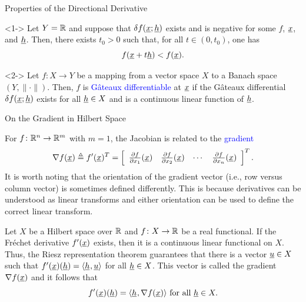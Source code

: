 \documentclass[10pt,english,aspectratio=169]{beamer}
\begin{document}
\begin{frame}{Properties of the Directional Derivative}

\begin{lemma}<1->
Let $Y=\mathbb{R}$ and suppose that $\delta f (\underline{x};\underline{h})$ exists and is negative for some $f$, $\underline{x}$, and $\underline{h}$.  Then, there exists $t_0 > 0$ such that, for all $t\in(0,t_0)$, one has \vspace{-2mm}
\[ f(\underline{x}+t \underline{h}) < f (\underline{x}). \]
\end{lemma}


\vspace{5mm}

\begin{definition}<2->
Let $f \colon X \rightarrow Y$ be a mapping from a vector space $X$ to a Banach space $(Y,\|\cdot\|)$.
Then, $f$ is \textcolor{blue}{G\^{a}teaux differentiable} at $\underline{x}$ if the G\^{a}teaux differential $\delta f (\underline{x};\underline{h})$ exists for all $\underline{h} \in X$ and is a continuous linear function of $\underline{h}$.
\end{definition}

\end{frame}


\begin{frame}{On the Gradient in Hilbert Space}

For $f\colon \mathbb{R}^n \to \mathbb{R}^m$ with $m=1$, the Jacobian is related to the \textcolor{blue}{gradient}
\[ \nabla f(\underline{x}) \triangleq f'(\underline{x})^T  = \left[ \begin{array}{cccc} \frac{\partial  f}{\partial  x_1} (\underline{x}) & \frac{\partial  f}{\partial  x_2} (\underline{x}) & \cdots & \frac{\partial  f}{\partial  x_n} (\underline{x}) \end{array} \right]^T. \]
It is worth noting that the orientation of the gradient vector (i.e., row versus column vector) is sometimes defined differently.
This is because derivatives can be understood as linear transforms and either orientation can be used to define the correct linear transform. 

\begin{example}
Let $X$ be a Hilbert space over $\mathbb{R}$ and $f\colon X \to \mathbb{R}$ be a real functional.
If the Fr\'{e}chet derivative $f'(\underline{x})$ exists, then it is a continuous linear functional on $X$.
Thus, the Riesz representation theorem guarantees that there is a vector $\underline{u} \in X$ such that
$ f'(\underline{x})(\underline{h}) = {\langle \underline{h}  \mskip1mu ,  \underline{u}  \rangle} $ for all $\underline{h}\in X$.
This vector is called the gradient $\nabla f(\underline{x})$ and it follows that \vspace{-1mm}
$$ f'(\underline{x})(\underline{h}) = {\langle \underline{h}  \mskip1mu ,  \nabla f (\underline{x})  \rangle} \text{ for all } \underline{h}\in X. $$
\end{example}

\end{frame}
\end{document}

